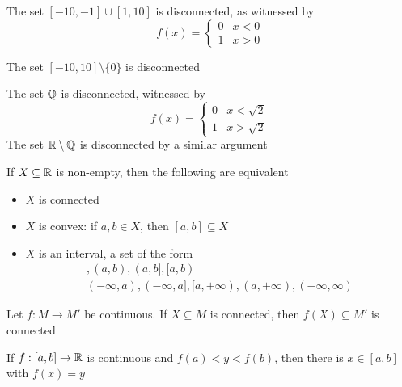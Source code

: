 \documentclass[11pt]{article}
\begin{document}
\begin{examplle}[]
The set \([-10,-1]\cup[1,10]\) is disconnected, as witnessed by
\begin{equation*}
f(x)=
\begin{cases}
0&x<0\\
1&x>0
\end{cases}
\end{equation*}
\end{examplle}

\begin{examplle}[]
The set \([-10,10]\setminus\{0\}\) is disconnected
\end{examplle}

\begin{examplle}[]
The set \(\mathbb{Q}\) is disconnected, witnessed by
\begin{equation*}
f(x)=
\begin{cases}
0&x<\sqrt{2}\\
1&x>\sqrt{2}
\end{cases}
\end{equation*}
The set \(\mathbb{R}\setminus\mathbb{Q}\) is disconnected by a similar argument
\end{examplle}

\begin{proposition}[]
If \(X\subseteq\mathbb{R}\) is non-empty, then the following are equivalent
\begin{itemize}
\item \(X\) is connected
\item \(X\) is convex: if \(a,b\in X\), then \([a,b]\subseteq X\)
\item \(X\) is an interval, a set of the form
\begin{gather*}
[a,b],(a,b),(a,b],[a,b)\\
(-\infty,a),(-\infty,a],[a,+\infty),(a,+\infty),(-\infty,\infty)
\end{gather*}
\end{itemize}
\end{proposition}

\begin{proposition}[]
Let \(f:M\to M'\) be continuous. If \(X\subseteq M\) is connected, then \(f(X)\subseteq M'\) is connected
\end{proposition}

\begin{corollary}
If \(f:[a,b]\to\mathbb{R}\) is continuous and \(f(a)<y<f(b)\), then there is \(x\in[a,b]\) with \(f(x)=y\)
\end{corollary}
\end{document}
